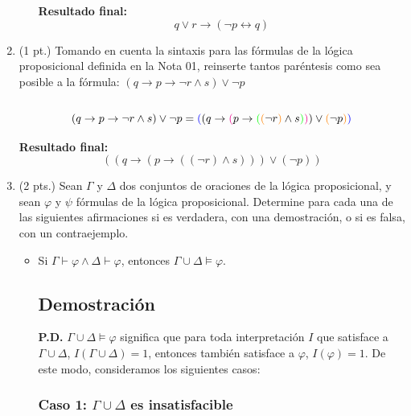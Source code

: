 \documentclass[11pt,letterpaper]{article}
\begin{document}
\begin{enumerate}
\begin{itemize}
      \textbf{Resultado final:}
      \[
      q \lor r \rightarrow (\neg p \leftrightarrow q)
      \]
    \end{itemize}
    
    \bigskip

  \item (1 pt.) Tomando en cuenta la sintaxis para las fórmulas de la lógica proposicional definida en la Nota 01, reinserte tantos paréntesis como sea posible a la fórmula: $(q \rightarrow p \rightarrow \neg r \land s) \lor \neg p$ \\
    \\
    \[
    (q \rightarrow p \rightarrow \neg r \land s) \lor \neg p = \textcolor{blue}{(}(q \rightarrow \textcolor{magenta}{(} p \rightarrow \textcolor{green}{(} \textcolor{orange}{(} \neg r \textcolor{orange}{)} \land s \textcolor{green}{)} \textcolor{magenta}{)}) \lor \textcolor{orange}{(}\neg p \textcolor{orange}{)} \textcolor{blue}{)}
    \]
    
    \textbf{Resultado final:}
    \[
    ((q \rightarrow (p \rightarrow ((\neg r) \land s))) \lor (\neg p))
    \]
    
  \bigskip

  \item (2 pts.) Sean $\Gamma$ y $\Delta$ dos conjuntos de oraciones de la lógica proposicional, y sean $\varphi$ y $\psi$ fórmulas de la lógica proposicional. Determine para cada una de las siguientes afirmaciones si es verdadera, con una demostración, o si es falsa, con un contraejemplo.

    \begin{itemize}
    \item Si $\Gamma \vdash \varphi \land \Delta \vdash \varphi$, entonces $\Gamma \cup \Delta \models \varphi$.
      \subsection*{Demostración}

      \textbf{P.D.} $\Gamma \cup \Delta \vDash \varphi$ significa que para toda interpretación $I$ que satisface a $\Gamma \cup \Delta$, $I(\Gamma \cup \Delta) = 1$, entonces también satisface a $\varphi$, $I(\varphi) = 1$. De este modo, consideramos los siguientes casos:

      \subsubsection*{Caso 1: $\Gamma \cup \Delta$ es insatisfacible}


\end{itemize}
\end{enumerate}
\end{document}
